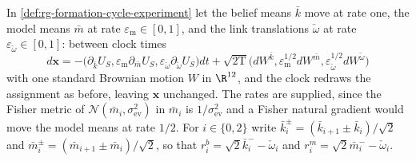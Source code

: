 In \cref{def:rg-formation-cycle-experiment} let the belief means $\bar k$ move at
rate one, the model means $\bar m$ at rate $\varepsilon_{\mathrm m}\in[0,1]$, and the
link translations $\check\omega$ at rate $\varepsilon_{\check\omega}\in[0,1]$: between clock times
\begin{equation}
d\mathbf x=-\bigl(\partial_{\bar k}U_S,\varepsilon_{\mathrm m}\partial_{\bar m}U_S,
\varepsilon_{\check\omega}\partial_{\check\omega} U_S\bigr)dt
+\sqrt{2\mathrm T}\bigl(dW^{\bar k},\varepsilon_{\mathrm m}^{1/2}dW^{\bar m},
\varepsilon_{\check\omega}^{1/2}dW^{\check\omega}\bigr)
\label{eq:obs-cycle-slow-model-kinetics}
\end{equation}
with one standard Brownian motion $W$ in $\R^{12}$, and the clock redraws the
assignment as before, leaving $\mathbf x$ unchanged. The rates are supplied, since
the Fisher metric of $\mathcal N(\bar m_i,\sigma^2_{\mathrm{ev}})$ in $\bar m_i$ is
$1/\sigma^2_{\mathrm{ev}}$ and a Fisher natural gradient would move the model means at
rate $1/2$. For $i\in\{0,2\}$ write $\bar k^\pm_i=(\bar k_{i+1}\pm\bar k_i)/\sqrt2$
and $\bar m^\pm_i=(\bar m_{i+1}\pm\bar m_i)/\sqrt2$, so that
$r^b_i=\sqrt2\bar k^-_i-\check\omega_i$ and $r^m_i=\sqrt2\bar m^-_i-\check\omega_i$.
